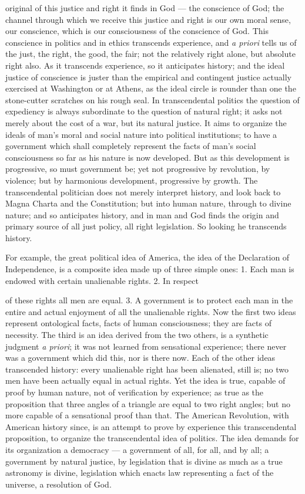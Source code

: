 \documentclass[12pt]{article}
\begin{document}
original of this justice and right it finds in God --- the 
conscience of God; the channel through which we receive this justice and right is our own moral sense, our 
conscience, which is our consciousness of the conscience 
of God. This conscience in politics and in ethics transcends experience, and \emph{a priori} tells us of the just, the 
right, the good, the fair; not the relatively right alone, 
but absolute right also. As it transcends experience, 
so it anticipates history; and the ideal justice of conscience is juster than the empirical and contingent justice actually exercised at Washington or at Athens, as 
the ideal circle is rounder than one the stone-cutter 
scratches on his rough seal. In transcendental politics the question of expediency is always subordinate 
to the question of natural right; it asks not merely 
about the cost of a war, but its natural justice. It 
aims to organize the ideals of man's moral and social 
nature into political institutions; to have a government 
which shall completely represent the facts of man's social consciousness so far as his nature is now developed. 
But as this development is progressive, so must government be; yet not progressive by revolution, by violence; 
but by harmonious development, progressive by growth. 
The transcendental politician does not merely interpret 
history, and look back to Magna Charta and the Constitution; but into human nature, through to divine 
nature; and so anticipates history, and in man and God 
finds the origin and primary source of all just policy, 
all right legislation. So looking he transcends history. 

For example, the great political idea of America, the 
idea of the Declaration of Independence, is a composite 
idea made up of three simple ones: 1. Each man is endowed with certain unalienable rights. 2. In respect 




of these rights all men are equal. 3. A government is 
to protect each man in the entire and actual enjoyment 
of all the unalienable rights. Now the first two ideas 
represent ontological facts, facts of human consciousness; they are facts of necessity. The third is an 
idea derived from the two others, is a synthetic judgment \emph{a priori}; it was not learned from sensational experience; there never was a government which did this, 
nor is there now. Each of the other ideas transcended 
history: every unalienable right has been alienated, still 
is; no two men have been actually equal in actual 
rights. Yet the idea is true, capable of proof by human nature, not of verification by experience; as true 
as the proposition that three angles of a triangle are 
equal to two right angles; but no more capable of a 
sensational proof than that. The American Revolution, with American history since, is an attempt to prove 
by experience this transcendental proposition, to organize the transcendental idea of politics. The idea demands for its organization a democracy --- a government of all, for all, and by all; a government by natural justice, by legislation that is divine as much as a 
true astronomy is divine, legislation which enacts law 
representing a fact of the universe, a resolution of 
God. 
\end{document}
